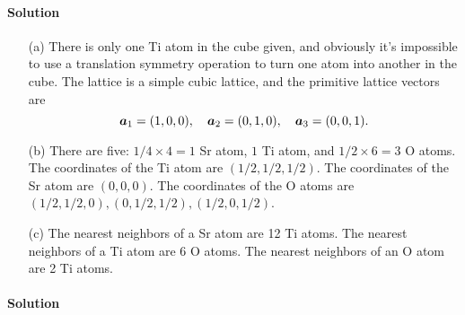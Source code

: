 \documentclass[hyperref, a4paper]{article}
\begin{document}
\paragraph{Solution} \begin{itemize}
\item[(a)] There is only one Ti atom in the cube given, 
and obviously it's impossible to use a translation symmetry operation 
to turn one atom into another in the cube.
The lattice is a simple cubic lattice,
and the primitive lattice vectors are 
\begin{equation}
    \vb*{a}_1 = (1, 0, 0), \quad \vb*{a}_2 = (0, 1, 0), \quad \vb*{a}_3 = (0, 0, 1).
\end{equation}
\item[(b)] There are five: $1/4 \times 4 = 1$ Sr atom, $1$ Ti atom, and 
$1/2 \times 6 = 3$ O atoms.
The coordinates of the Ti atom are $(1/2, 1/2, 1/2)$.
The coordinates of the Sr atom are $(0, 0, 0)$.
The coordinates of the O atoms are $(1/2, 1/2, 0), (0, 1/2, 1/2), (1/2, 0, 1/2)$.
\item[(c)] The nearest neighbors of a Sr atom are 12 Ti atoms.
The nearest neighbors of a Ti atom are 6 O atoms.
The nearest neighbors of an O atom are 2 Ti atoms.
\end{itemize}

\paragraph{Solution} 
\end{document}
